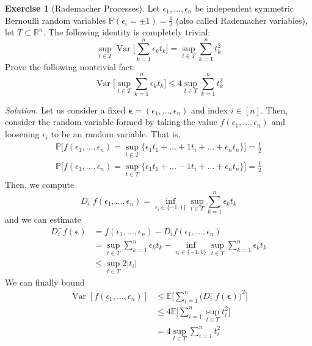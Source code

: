 \documentclass{article}
\DeclareMathOperator{\Var}{Var}
\theoremstyle{definition}
\newtheorem{exercise}{Exercise}[section]
\theoremstyle{remark}
\theoremstyle{definition}
\newenvironment{solution}{\noindent \textit{Solution.}}{}
\begin{document}
\begin{exercise}[Rademacher Processes]
Let $\epsilon_1, \ldots, \epsilon_n$ be independent symmetric Bernoulli random variables $\mathbb{P}(\epsilon_i = \pm 1) = \frac{1}{2}$ (also called Rademacher variables), let $T \subset \mathbb{R}^n$. The following identity is completely trivial: 
\[\sup_{t \in T} \Var \bigg[ \sum_{k=1}^n \epsilon_k t_k \bigg] = \sup_{t \in T} \sum_{k=1}^n t_k^2\]
Prove the following nontrivial fact: 
\[\Var \bigg[ \sup_{t \in T} \sum_{k=1}^n \epsilon_k t_k \bigg] \leq 4 \sup_{t \in T} \sum_{k=1}^n t_k^2\]
\end{exercise}
\begin{solution}
Let us consider a fixed $\boldsymbol{\epsilon} = (\epsilon_1, \ldots, \epsilon_n)$ and index $i \in [n]$. Then, consider the random variable formed by taking the value $f(\epsilon_1, \ldots, \epsilon_n)$ and loosening $\epsilon_i$ to be an random variable. That is, 
\begin{align*}
    \mathbb{P} \Big[ f(\epsilon_1, \ldots, \epsilon_n) = \sup_{t \in T} \{\epsilon_1 t_1 + \ldots + 1 t_i + \ldots + \epsilon_n t_n\} \Big] = \frac{1}{2} \\
    \mathbb{P} \Big[ f(\epsilon_1, \ldots, \epsilon_n) = \sup_{t \in T} \{\epsilon_1 t_1 + \ldots - 1 t_i + \ldots + \epsilon_n t_n\} \Big] = \frac{1}{2} 
\end{align*}
Then, we compute 
\[D_i^- f (\epsilon_1, \ldots, \epsilon_n) = \inf_{\epsilon_i \in \{-1, 1\}} \sup_{t \in T} \sum_{k=1}^n \epsilon_k t_k\]
and we can estimate 
\begin{align*}
    D_i^- f(\boldsymbol{\epsilon}) & = f(\epsilon_1, \ldots, \epsilon_n) - D_i f (\epsilon_1, \ldots, \epsilon_n) \\
    & = \sup_{t \in T} \sum_{k=1}^n \epsilon_k t_k - \inf_{\epsilon_i \in \{-1, 1\}} \sup_{t \in T} \sum_{k=1}^n \epsilon_k t_k \\
    & \leq \sup_{t \in T} 2 |t_i| 
\end{align*}
We can finally bound 
\begin{align*}
    \Var[ f(\epsilon_1, \ldots, \epsilon_n)] & \leq \mathbb{E} \bigg[ \sum_{i=1}^n \big( D_i^- f(\boldsymbol{\epsilon})\big)^2 \bigg] \\
    & \leq 4 \mathbb{E} \bigg[ \sum_{i=1}^n \sup_{t \in T} t_i^2 \bigg] \\
    & = 4 \sup_{t \in T} \sum_{i=1}^n t_i^2 
\end{align*}
\end{solution}
\end{document}
